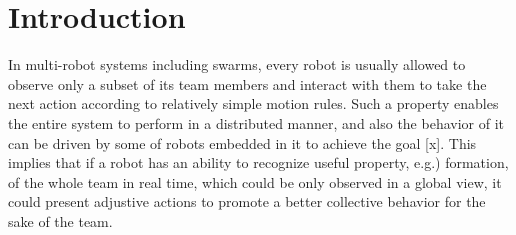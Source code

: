 \documentclass[letterpaper, 10 pt, conference]{ieeeconf}  %
\begin{document}
\begin{abstract}
		
%		
	\end{abstract}
	
	
	
	\section{Introduction}
	\label{sec:intro}
	
	In multi-robot systems including swarms, every robot is usually allowed to observe 
	only a subset of its team members and interact with them to take the next action 
	according to relatively simple motion rules. 
	Such a property enables the entire system to perform in a distributed manner, and 
	also the behavior of it can be driven by some of robots embedded in it to 
	achieve the goal [x]. 
	This implies that if a robot has an ability to recognize useful property, e.g.) formation, 
	of the whole team in real time, which could be only observed in a global view,
	it could present adjustive actions to promote a better collective behavior 
	for the sake of the team.
	
\end{document}
